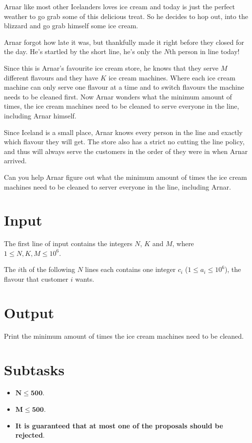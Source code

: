 Arnar like most other Icelanders loves ice cream and today is just the perfect
weather to go grab some of this delicious treat. So he decides to hop out, into
the blizzard and go grab himself some ice cream.

Arnar forgot how late it was, but thankfully made it right before they closed
for the day. He's startled by the short line, he's only the $N$th person in
line today!

Since this is Arnar's favourite ice cream store, he knows that they serve $M$
different flavours and they have $K$ ice cream machines.
Where each ice cream machine can only serve one flavour at a time and to switch
flavours the machine needs to be cleaned first.
Now Arnar wonders what the minimum amount of times, the ice cream machines
need to be cleaned to serve everyone in the line, including Arnar himself.

Since Iceland is a small place, Arnar knows every person in the line and exactly
which flavour they will get.
The store also has a strict no cutting the line policy, and thus will always serve
the customers in the order of they were in when Arnar arrived.

Can you help Arnar figure out what the minimum amount of times the ice cream
machines need to be cleaned to server everyone in the line, including Arnar.

\section*{Input}
The first line of input contains the integers $N$, $K$ and $M$, where $1 \leq
N, K, M \leq 10^6$.

The $i$th of the following $N$ lines each contains one integer $c_i$
($1 \leq a_i \leq 10^6$), the flavour that customer $i$ wants.

\section*{Output}
Print the minimum amount of times the ice cream machines need to be cleaned.

\section*{Subtasks}
\begin{itemize}
    \item $\mathbf{N} \mathbf{\leq} \mathbf{500}$.
    \item $\mathbf{M} \mathbf{\leq} \mathbf{500}$.
    \item \textbf{It is guaranteed that at most one of the proposals should be
    rejected}.
\end{itemize}


